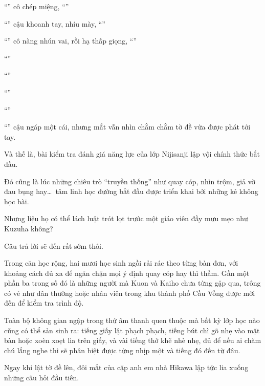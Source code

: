 \documentclass[../main.tex]{subfiles}
\begin{document}
``'' cô chép miệng, ``''

``'' cậu khoanh tay, nhíu mày, ``''

``'' cô nàng nhún vai, rồi hạ thấp giọng, ``''

``''

``''

``''

``''

``'' cậu ngáp một cái, nhưng mắt vẫn nhìn chằm chằm tờ đề vừa được phát tới tay.

Và thế là, bài kiểm tra đánh giá năng lực của lớp Nijisanji lập vội chính thức bắt đầu.

Đó cũng là lúc những chiêu trò ``truyền thống'' như quay cóp, nhìn trộm, giả vờ đau bụng hay\dots\ tâm linh học đường bắt đầu được triển khai bởi những kẻ không học bài.

Nhưng liệu họ có thể lách luật trót lọt trước một giáo viên đầy mưu mẹo như Kuzuha không?

Câu trả lời sẽ đến rất sớm thôi.

\ct

Trong căn học rộng, hai mươi học sinh ngồi rải rác theo từng bàn đơn, với khoảng cách đủ xa để ngăn chặn mọi ý định quay cóp hay thì thầm. Gần một phần ba trong số đó là những người mà Kuon và Kaiho chưa từng gặp qua, trông có vẻ như dân thường hoặc nhân viên trong khu thành phố Cầu Vồng được mời đến để kiểm tra trình độ.

Toàn bộ không gian ngập trong thứ âm thanh quen thuộc mà bất kỳ lớp học nào cũng có thể sản sinh ra: tiếng giấy lật phạch phạch, tiếng bút chì gõ nhẹ vào mặt bàn hoặc xoèn xoẹt lia trên giấy, và vài tiếng thở khẽ nhè nhẹ, đủ để nếu ai chăm chú lắng nghe thì sẽ phân biệt được từng nhịp một và tiếng đó đến từ đâu.

Ngay khi lật tờ đề lên, đôi mắt của cặp anh em nhà Hikawa lập tức lia xuống những câu hỏi đầu tiên.
\end{document}
